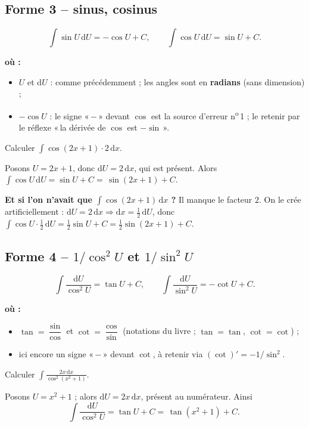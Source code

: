 \documentclass[11pt,a4paper]{article}
\newenvironment{ou}{%
  \par\smallskip\noindent\textbf{où :}\nopagebreak
  \begin{itemize}[leftmargin=1.8em,topsep=2pt,itemsep=1.5pt,parsep=0pt]}%
  {\end{itemize}}
\newcommand{\dd}{\mathrm{d}}
\newcommand{\tg}{\tan}
\newcommand{\cotg}{\cot}
\begin{document}
\subsection{Forme 3 -- sinus, cosinus}

\begin{formule}
\[
\boxed{\;\int \sin U\,\dd U = -\cos U+C,\qquad \int \cos U\,\dd U = \sin U+C.\;}
\]
\begin{ou}
  \item $U$ et $\dd U$ : comme précédemment ; les angles sont en \textbf{radians} (sans dimension) ;
  \item $-\cos U$ : le signe «\,$-$\,» devant $\cos$ est la source d'erreur n\textsuperscript{o}\,1 ; le retenir
        par le réflexe «\,la dérivée de $\cos$ est $-\sin$\,».
\end{ou}
\end{formule}

\begin{exemple}
Calculer $\displaystyle\int \cos(2x+1)\cdot 2\,\dd x$.

\smallskip
Posons $U=2x+1$, donc $\dd U=2\,\dd x$, qui est présent. Alors
$\int\cos U\,\dd U=\sin U+C=\boxed{\,\sin(2x+1)+C.\,}$

\smallskip
\textbf{Et si l'on n'avait que $\int\cos(2x+1)\,\dd x$ ?} Il manque le facteur $2$. On le crée
artificiellement : $\dd U=2\,\dd x\Rightarrow \dd x=\tfrac12\,\dd U$, donc
$\int\cos U\cdot\tfrac12\,\dd U=\tfrac12\sin U+C=\tfrac12\sin(2x+1)+C$.
\end{exemple}

\subsection{Forme 4 -- $1/\cos^2 U$ et $1/\sin^2 U$}

\begin{formule}
\[
\boxed{\;\int\frac{\dd U}{\cos^2 U}=\tg U+C,\qquad \int\frac{\dd U}{\sin^2 U}=-\cotg U+C.\;}
\]
\begin{ou}
  \item $\tg=\dfrac{\sin}{\cos}$ et $\cotg=\dfrac{\cos}{\sin}$ (notations du livre ; $\tg=\tan$, $\cotg=\cot$) ;
  \item ici encore un signe «\,$-$\,» devant $\cotg$, à retenir via $(\cotg)'=-1/\sin^2$.
\end{ou}
\end{formule}

\begin{exemple}
Calculer $\displaystyle\int\frac{2x\,\dd x}{\cos^2(x^2+1)}$.

\smallskip
Posons $U=x^2+1$ ; alors $\dd U=2x\,\dd x$, présent au numérateur. Ainsi
\[
\int\frac{\dd U}{\cos^2 U}=\tg U+C=\boxed{\,\tan(x^2+1)+C.\,}
\]
\end{exemple}
\end{document}
